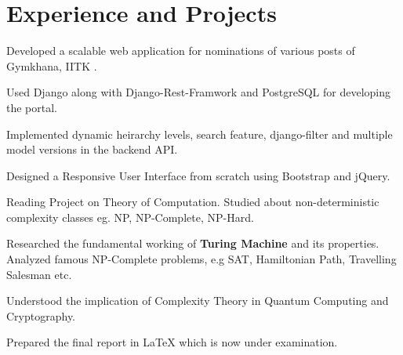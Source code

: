 \documentclass[]{deedy-resume-openfont}
\begin{document}
\hfill
\begin{minipage}[t]{0.66\textwidth} 


\section{Experience and Projects}
\vspace{0.4 cm}
\vspace{\topsep} %
\begin{tightemize}
  \item Developed a scalable web application for nominations of various posts of Gymkhana, IITK .
  \item Used Django along with Django-Rest-Framwork and PostgreSQL for developing the portal.  
  \item	Implemented dynamic heirarchy levels, search feature, django-filter and multiple model versions in the backend API. \\
  \item Designed a Responsive User Interface from scratch using Bootstrap and jQuery.
\end{tightemize}
\vspace{0.2 cm}
\begin{tightemize}
  \item Reading Project on Theory of Computation. Studied about non-deterministic complexity classes eg. NP, NP-Complete, NP-Hard.
  \item Researched the fundamental working of \textbf{Turing Machine} and its properties. Analyzed famous NP-Complete problems, e.g SAT, Hamiltonian Path, Travelling Salesman etc. 
  \item Understood the implication of Complexity Theory in Quantum Computing and Cryptography.
  \item Prepared the final report in \LaTeX{} which is now under examination. 
\end{tightemize}
\vspace{1 cm}





\end{minipage}
\end{document}
